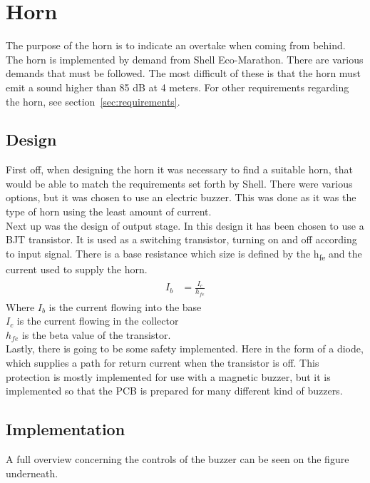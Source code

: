 \section{Horn}
The purpose of the horn is to indicate an overtake when coming from behind. The horn is implemented by demand from Shell Eco-Marathon. There are various demands that must be followed. The most difficult of these is that the horn must emit a sound higher than 85 dB at 4 meters. For other requirements regarding the horn, see section~\vref{sec:requirements}.  

\subsection{Design}
First off, when designing the horn it was necessary to find a suitable horn, that would be able to match the requirements set forth by Shell. There were various options, but it was chosen to use an electric buzzer. This was done as it was the type of horn using the least amount of current. \\
Next up was the design of output stage. In this design it has been chosen to use a BJT transistor. It is used as a switching transistor, turning on and off according to input signal. There is a base resistance which size is defined by the h\textsubscript{fe} and the current used to supply the horn. \\
\begin{align}
	\begin{split}
		I_b &= \frac{I_c}{h_{fe}}
	\end{split}
\end{align}
Where $I_b$ is the current flowing into the base \\ 
$I_c$ is the current flowing in the collector \\ 
$h_{fe}$ is the beta value of the transistor. \\

Lastly, there is going to be some safety implemented. Here in the form of a diode, which supplies a path for return current when the transistor is off. This protection is mostly implemented for use with a magnetic buzzer, but it is implemented so that the PCB is prepared for many different kind of buzzers.   

\subsection{Implementation}
A full overview concerning the controls of the buzzer can be seen on the figure underneath.

